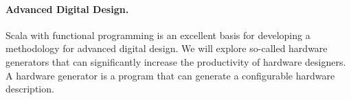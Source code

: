 \documentclass[fleqn,12pt]{article}
\begin{document}
\paragraph{Advanced Digital Design.}
Scala with functional programming is an excellent basis for developing a methodology for
advanced digital design.
We will explore so-called hardware generators that can significantly increase the productivity of hardware designers.
A hardware generator is a program that can generate a configurable
hardware description.



\end{document}
